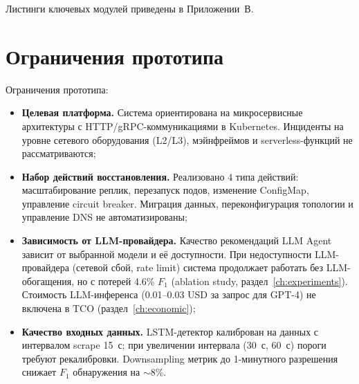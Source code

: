 Листинги ключевых модулей приведены в Приложении~В.

\section{Ограничения прототипа}

Ограничения прототипа:

\begin{itemize}
    \item \textbf{Целевая платформа.} Система ориентирована на микросервисные архитектуры с HTTP/gRPC-коммуникациями в Kubernetes. Инциденты на уровне сетевого оборудования (L2/L3), мэйнфреймов и serverless-функций не рассматриваются;

    \item \textbf{Набор действий восстановления.} Реализовано 4 типа действий: масштабирование реплик, перезапуск подов, изменение ConfigMap, управление circuit breaker. Миграция данных, переконфигурация топологии и управление DNS не автоматизированы;

    \item \textbf{Зависимость от LLM-провайдера.} Качество рекомендаций LLM Agent зависит от выбранной модели и её доступности. При недоступности LLM-провайдера (сетевой сбой, rate limit) система продолжает работать без LLM-обогащения, но с потерей 4.6\% $F_1$ (ablation study, раздел~\ref{ch:experiments}). Стоимость LLM-инференса (0.01--0.03 USD за запрос для GPT-4) не включена в TCO (раздел~\ref{ch:economic});

    \item \textbf{Качество входных данных.} LSTM-детектор калиброван на данных с интервалом scrape 15~с; при увеличении интервала (30~с, 60~с) пороги требуют рекалибровки. Downsampling метрик до 1-минутного разрешения снижает $F_1$ обнаружения на $\sim$8\%.
\end{itemize}
